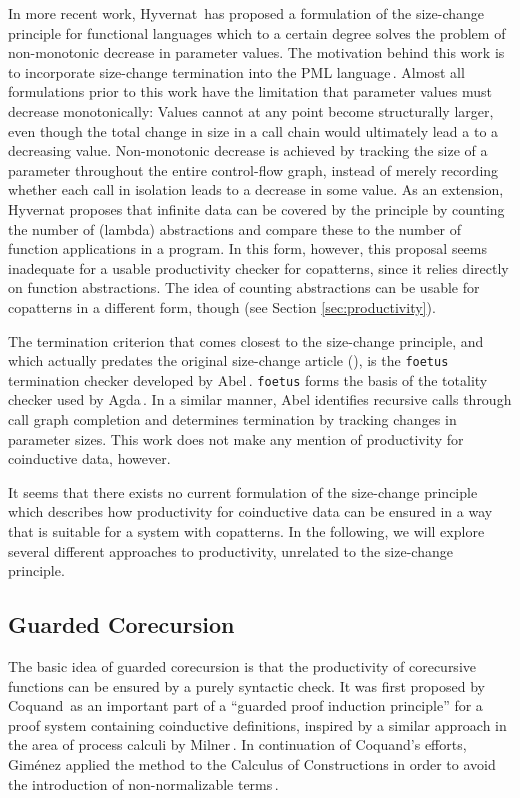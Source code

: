 In more recent work, Hyvernat\,\citep{Hyvernat13} has proposed a formulation of the size-change principle for functional languages which to a certain degree solves the problem of non-monotonic decrease in parameter values. The motivation behind this work is to incorporate size-change termination into the PML language\,\cite{PMLLanguage}. Almost all formulations prior to this work have the limitation that parameter values must decrease monotonically: Values cannot at any point become structurally larger, even though the total change in size in a call chain would ultimately lead a to a decreasing value. Non-monotonic decrease is achieved by tracking the size of a parameter throughout the entire control-flow graph, instead of merely recording whether each call in isolation leads to a decrease in some value. As an extension, Hyvernat proposes that infinite data can be covered by the principle by counting the number of (lambda) abstractions and compare these to the number of function applications in a program. In this form, however, this proposal seems inadequate for a usable productivity checker for copatterns, since it relies directly on function abstractions. The idea of counting abstractions can be usable for copatterns in a different form, though (see Section \ref{sec:productivity}).

The termination criterion that comes closest to the size-change principle, and which actually predates the original size-change article (\citep{LeeJones01SizeChange}), is the \texttt{foetus} termination checker developed by Abel\,\citep{Abel98foetus}. \texttt{foetus} forms the basis of the totality checker used by Agda\,\citep{Norell:thesis}. In a similar manner, Abel identifies recursive calls through call graph completion and determines termination by tracking changes in parameter sizes. This work does not make any mention of productivity for coinductive data, however.

It seems that there exists no current formulation of the size-change principle which describes how productivity for coinductive data can be ensured in a way that is suitable for a system with copatterns. In the following, we will explore several different approaches to productivity, unrelated to the size-change principle.

\subsection{Guarded Corecursion}
The basic idea of guarded corecursion is that the productivity of corecursive functions can be ensured by a purely syntactic check. It was first proposed by Coquand\,\citep{Coquand94} as an important part of a ``guarded proof induction principle'' for a proof system containing coinductive definitions, inspired by a similar approach in the area of process calculi by Milner\,\citep{Milner82}. In continuation of Coquand's efforts, Gim\'{e}nez applied the method to the Calculus of Constructions in order to avoid the introduction of non-normalizable terms\,\citep{Gimenez95}. 

